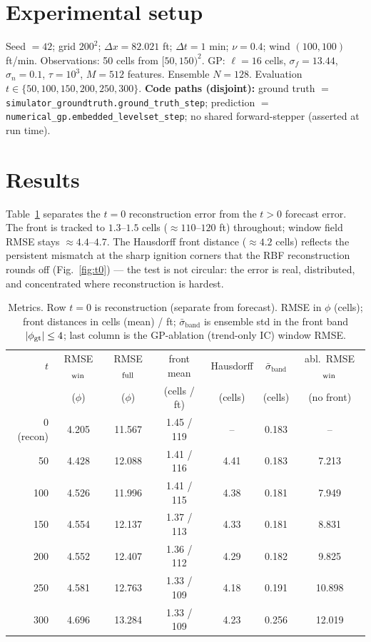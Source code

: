 \documentclass[11pt]{article}
\begin{document}
\section{Experimental setup}

Seed $=42$; grid $200^2$; $\Delta x=82.021$ ft; $\Delta t=1$ min; $\nu=0.4$; wind
$(100,100)$ ft/min. Observations: 50 cells from $[50,150)^2$. GP: $\ell=16$ cells,
$\sigma_f=13.44$, $\sigma_n=0.1$, $\tau=10^3$, $M=512$ features. Ensemble $N=128$.
Evaluation $t\in\{50,100,150,200,250,300\}$. \textbf{Code paths (disjoint):} ground
truth $=$ \texttt{simulator\_groundtruth.ground\_truth\_step}; prediction $=$
\texttt{numerical\_gp.embedded\_levelset\_step}; no shared forward-stepper
(asserted at run time).

\section{Results}
\label{sec:results}

Table~\ref{tab:metrics} separates the $t=0$ reconstruction error from the $t>0$
forecast error. The front is tracked to $1.3$--$1.5$ cells ($\approx110$--$120$ ft)
throughout; window field RMSE stays $\approx4.4$--$4.7$. The Hausdorff front
distance ($\approx4.2$ cells) reflects the persistent mismatch at the sharp
ignition corners that the RBF reconstruction rounds off (Fig.~\ref{fig:t0}) --- the
test is not circular: the error is real, distributed, and concentrated where
reconstruction is hardest.

\begin{table}[h]
  \centering
  \caption{Metrics. Row $t=0$ is reconstruction (separate from forecast). RMSE in
    $\phi$ (cells); front distances in cells (mean) / ft; $\bar\sigma_{\text{band}}$
    is ensemble std in the front band $|\phi_{\rm gt}|\le4$; last column is the
    GP-ablation (trend-only IC) window RMSE.}
  \label{tab:metrics}
  \begin{tabular}{@{}rcccccc@{}}
    \toprule
    $t$ & RMSE$_{\rm win}$ & RMSE$_{\rm full}$ & front mean & Hausdorff
    & $\bar\sigma_{\text{band}}$ & abl.\ RMSE$_{\rm win}$ \\
     & ($\phi$) & ($\phi$) & (cells / ft) & (cells) & (cells) & (no front) \\
    \midrule
    0 (recon) & 4.205 & 11.567 & 1.45 / 119 & --   & 0.183 & -- \\
    50  & 4.428 & 12.088 & 1.41 / 116 & 4.41 & 0.183 & 7.213 \\
    100 & 4.526 & 11.996 & 1.41 / 115 & 4.38 & 0.181 & 7.949 \\
    150 & 4.554 & 12.137 & 1.37 / 113 & 4.33 & 0.181 & 8.831 \\
    200 & 4.552 & 12.407 & 1.36 / 112 & 4.29 & 0.182 & 9.825 \\
    250 & 4.581 & 12.763 & 1.33 / 109 & 4.18 & 0.191 & 10.898 \\
    300 & 4.696 & 13.284 & 1.33 / 109 & 4.23 & 0.256 & 12.019 \\
    \bottomrule
  \end{tabular}
\end{table}
\end{document}
